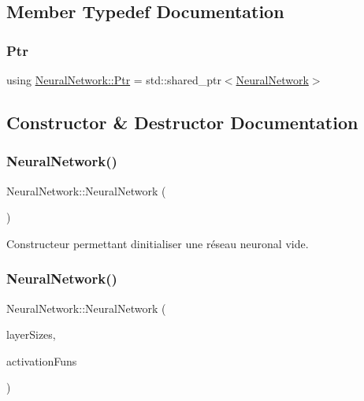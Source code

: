 \subsection{Member Typedef Documentation}
\mbox{\label{classNeuralNetwork_a31de381df65f261fd0f38e0559995d1a}} 
\subsubsection{\texorpdfstring{Ptr}{Ptr}}
{\footnotesize\ttfamily using \hyperlink{classNeuralNetwork_a31de381df65f261fd0f38e0559995d1a}{Neural\+Network\+::\+Ptr} =  std\+::shared\+\_\+ptr$<$\hyperlink{classNeuralNetwork}{Neural\+Network}$>$}



\subsection{Constructor \& Destructor Documentation}
\mbox{\label{classNeuralNetwork_accce4a7728e89a009a9d4ca1758c9b9d}} 
\subsubsection{\texorpdfstring{Neural\+Network()}{NeuralNetwork()}\hspace{0.1cm}{\footnotesize\ttfamily [1/4]}}
{\footnotesize\ttfamily Neural\+Network\+::\+Neural\+Network (\begin{DoxyParamCaption}{ }\end{DoxyParamCaption})}



Constructeur permettant d\textquotesingle{}initialiser une réseau neuronal vide. 

\mbox{\label{classNeuralNetwork_a85cd20f411e96dfd28954fcda39badb7}} 
\subsubsection{\texorpdfstring{Neural\+Network()}{NeuralNetwork()}\hspace{0.1cm}{\footnotesize\ttfamily [2/4]}}
{\footnotesize\ttfamily Neural\+Network\+::\+Neural\+Network (\begin{DoxyParamCaption}\item[{std\+::vector$<$ unsigned int $>$}]{layer\+Sizes,  }\item[{std\+::vector$<$ \hyperlink{structFunctions_ad25362ffa52b2f7933431190546593ac}{Functions\+::\+Activation\+Fun} $>$}]{activation\+Funs }\end{DoxyParamCaption})}



